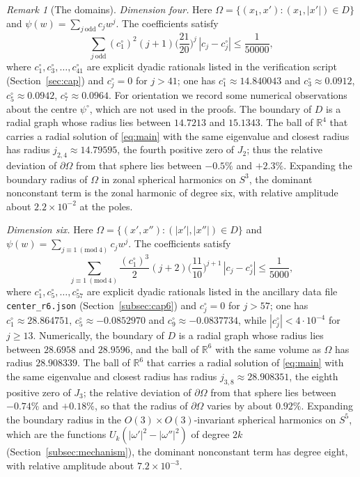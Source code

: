 \documentclass[11pt]{amsart}
\theoremstyle{definition}
\theoremstyle{remark}
\newtheorem{remark}[theorem]{Remark}
\numberwithin{equation}{section}
\newcommand{\R}{\mathbb{R}}
\begin{document}
\begin{remark}[The domains]
\emph{Dimension four.} Here $\Omega=\{(x_1,x'):(x_1,|x'|)\in D\}$ and $\psi(w)=\sum_{j\ \mathrm{odd}}c_jw^j$. The coefficients satisfy
\[
\sum_{j\ \mathrm{odd}}(c_1^\circ)^2(j+1)\Big(\frac{21}{20}\Big)^{j}\,|c_j-c_j^\circ|\leq\frac1{50000},
\]
where $c^\circ_1,c^\circ_3,\ldots,c^\circ_{41}$ are explicit dyadic rationals listed in the verification script (Section~\ref{sec:cap}) and $c^\circ_j=0$ for $j>41$; one has $c_1^\circ\approx14.840043$ and $c^\circ_3\approx0.0912$, $c^\circ_5\approx0.0942$, $c^\circ_7\approx0.0964$. For orientation we record some numerical observations about the centre $\psi^\circ$, which are not used in the proofs. The boundary of $D$ is a radial graph whose radius lies between $14.7213$ and $15.1343$. The ball of $\R^4$ that carries a radial solution of \eqref{eq:main} with the same eigenvalue and closest radius has radius $j_{2,4}\approx14.79595$, the fourth positive zero of $J_2$; thus the relative deviation of $\partial\Omega$ from that sphere lies between $-0.5\%$ and $+2.3\%$. Expanding the boundary radius of $\Omega$ in zonal spherical harmonics on $S^3$, the dominant nonconstant term is the zonal harmonic of degree six, with relative amplitude about $2.2\times10^{-2}$ at the poles.

\emph{Dimension six.} Here $\Omega=\{(x',x''):(|x'|,|x''|)\in D\}$ and $\psi(w)=\sum_{j\equiv1\ (\mathrm{mod}\ 4)}c_jw^j$. The coefficients satisfy
\[
\sum_{j\equiv1\ (\mathrm{mod}\ 4)}\frac{(c_1^\circ)^3}{2}(j+2)\Big(\frac{11}{10}\Big)^{j+1}\,|c_j-c_j^\circ|\leq\frac1{5000},
\]
where $c^\circ_1,c^\circ_5,\ldots,c^\circ_{57}$ are explicit dyadic rationals listed in the ancillary data file \texttt{center\_r6.json} (Section~\ref{subsec:cap6}) and $c^\circ_j=0$ for $j>57$; one has $c_1^\circ\approx28.864751$, $c^\circ_5\approx-0.0852970$ and $c^\circ_9\approx-0.0837734$, while $|c^\circ_j|<4\cdot10^{-4}$ for $j\geq13$. Numerically, the boundary of $D$ is a radial graph whose radius lies between $28.6958$ and $28.9596$, and the ball of $\R^6$ with the same volume as $\Omega$ has radius $28.908339$. The ball of $\R^6$ that carries a radial solution of \eqref{eq:main} with the same eigenvalue and closest radius has radius $j_{3,8}\approx28.908351$, the eighth positive zero of $J_3$; the relative deviation of $\partial\Omega$ from that sphere lies between $-0.74\%$ and $+0.18\%$, so that the radius of $\partial\Omega$ varies by about $0.92\%$. Expanding the boundary radius in the $O(3)\times O(3)$-invariant spherical harmonics on $S^5$, which are the functions $U_k(|\omega'|^2-|\omega''|^2)$ of degree $2k$ (Section~\ref{subsec:mechanism}), the dominant nonconstant term has degree eight, with relative amplitude about $7.2\times10^{-3}$.


\end{remark}
\end{document}
